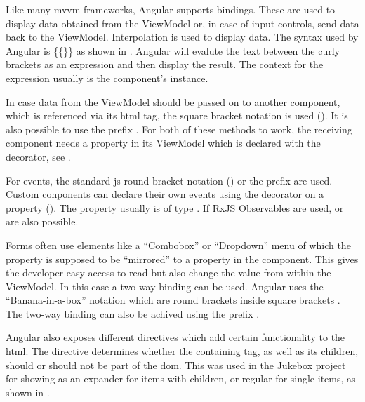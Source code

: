
Like many \gls{mvvm} frameworks, Angular supports bindings. These are used to display data obtained from the ViewModel or, in case of input controls, send data back to the ViewModel. Interpolation is used to display data. The syntax used by Angular is \{\{\}\} as shown in . Angular will evalute the text between the curly brackets as an expression and then display the result. The context for the expression usually is the component's instance.

In case data from the ViewModel should be passed on to another component, which is referenced via its \gls{html} tag, the square bracket notation is used (). It is also possible to use the  prefix \zB {}. For both of these methods to work, the receiving component needs a property in its ViewModel which is declared with the  decorator, see .

For events, the standard \gls{js} round bracket notation () or the  prefix \zB {} are used. Custom conponents can declare their own events using the  decorator on a property (). The property usually is of type . If RxJS Observables are used,  or  are also possible.

Forms often use elements like a \enquote{Combobox} or \enquote{Dropdown} menu of which the  property is supposed to be \enquote{mirrored} to a property in the component. This gives the developer easy access to read but also change the value from within the ViewModel. In this case a two-way binding can be used. Angular uses the \enquote{Banana-in-a-box} notation which are round brackets inside square brackets \zB {}. The two-way binding can also be achived using the  prefix \zB {}.


Angular also exposes different directives which add certain functionality to the \gls{html}. The  directive determines whether the containing tag, as well as its children, should or should not be part of the \gls{dom}. This was used in the Jukebox project for showing  as an expander for items with children, or regular for single items, as shown in .

